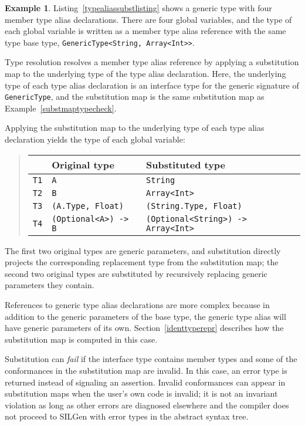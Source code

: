 \documentclass[a4paper,headsepline,bibliography=totoc,toc=flat,fleqn,twoside=semi]{scrbook}
\theoremstyle{definition}
\theoremstyle{definition}
\newtheorem{example}{Example}[chapter]
\theoremstyle{definition}
\begin{document}
\begin{example} Listing~\ref{typealiassubstlisting} shows a generic type with four member type alias declarations. There are four global variables, and the type of each global variable is written as a member type alias reference with the same type base type, \texttt{GenericType<String, Array<Int>>}. 

Type resolution resolves a member type alias reference by applying a substitution map to the underlying type of the type alias declaration. Here, the underlying type of each type alias declaration is an interface type for the generic signature of \texttt{GenericType}, and the substitution map is the same substitution map as Example~\ref{substmaptypecheck}.

Applying the substitution map to the underlying type of each type alias declaration yields the type of each global variable:
\begin{quote}
\begin{tabular}{|l|l|l|}
\hline
&\textbf{Original type}&\textbf{Substituted type}\\
\hline
\texttt{T1}&\texttt{A}&\texttt{String}\\
\texttt{T2}&\texttt{B}&\texttt{Array<Int>}\\
\texttt{T3}&\texttt{(A.Type, Float)}&\texttt{(String.Type, Float)}\\
\texttt{T4}&\texttt{(Optional<A>) -> B}&\texttt{(Optional<String>) -> Array<Int>}\\
\hline
\end{tabular}
\end{quote}
The first two original types are generic parameters, and substitution directly projects the corresponding replacement type from the substitution map; the second two original types are substituted by recursively replacing generic parameters they contain.

References to generic type alias declarations are more complex because in addition to the generic parameters of the base type, the generic type alias will have generic parameters of its own. Section~\ref{identtyperepr} describes how the substitution map is computed in this case.
\end{example}

Substitution can \emph{fail} if the interface type contains member types and some of the conformances in the substitution map are invalid. In this case, an error type is returned instead of signaling an assertion. Invalid conformances can appear in substitution maps when the user's own code is invalid; it is not an invariant violation as long as other errors are diagnosed elsewhere and the compiler does not proceed to SILGen with error types in the abstract syntax tree.
\end{document}

